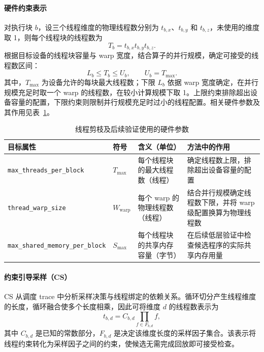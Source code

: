 \documentclass[11pt,twocolumn]{ctexart}
\begin{document}
\paragraph{硬件约束表示}
对执行块 $b$，设三个线程维度的物理线程数分别为 $t_{b,x}$、$t_{b,y}$ 和 $t_{b,z}$，未使用的维度取 1，则每个线程块的线程数为
\begin{equation}
T_b=t_{b,x}t_{b,y}t_{b,z}.
\label{eq:thread-count}
\end{equation}
根据目标设备的线程块容量与 warp 宽度，结合算子的并行规模，确定可接受的线程数区间：
\begin{equation}
L_b\le T_b\le U_b,\qquad U_b=T_{\max}.
\label{eq:thread-range}
\end{equation}
其中，$T_{\max}$ 为设备允许的每块最大线程数；下限 $L_b$ 依据 warp 宽度确定，在并行规模充足时取一个 warp 的线程数，在较小计算规模下取 1。上限约束排除超出设备容量的配置，下限约束则限制并行规模充足时过小的线程配置。相关硬件参数及其作用见表~\ref{tab:target-attributes}。

\begin{table}[tb]
\centering
\caption{线程剪枝及后续验证使用的硬件参数}
\label{tab:target-attributes}
\small
\setlength{\tabcolsep}{4pt}
\renewcommand{\arraystretch}{1.15}
\begin{tabular}{@{}lp{}p{}p{}@{}}
\toprule
目标属性 & 符号 & 含义（单位） & 方法中的作用 \\
\midrule
\texttt{max\_threads\_per\_block} & $T_{\max}$ & 每个线程块的最大线程数（线程） & 确定线程数上限，排除超出设备容量的配置 \\
\texttt{thread\_warp\_size} & $W_{\mathrm{warp}}$ & 每个 warp 的物理线程数（线程） & 结合并行规模确定线程数下限，并将 warp 级配置换算为物理线程数 \\
\texttt{max\_shared\_memory\_per\_block} & $S_{\max}$ & 每个线程块的共享内存容量（字节） & 在后续低层验证中检查候选程序的实际共享内存用量 \\
\bottomrule
\end{tabular}
\end{table}

\paragraph{约束引导采样（CS）}
CS 从调度 trace 中分析采样决策与线程绑定的依赖关系。循环切分产生线程维度的长度，循环融合使多个长度相乘，因此可将维度 $d$ 的线程数表示为
\begin{equation}
t_{b,d}=C_{b,d}\prod_{f\in F_{b,d}}f,
\label{eq:thread-dim}
\end{equation}
其中 $C_{b,d}$ 是已知的常数部分，$F_{b,d}$ 是决定该维度长度的采样因子集合。该表示将线程约束转化为采样因子之间的约束，使候选无需完成回放即可接受检查。
\end{document}
